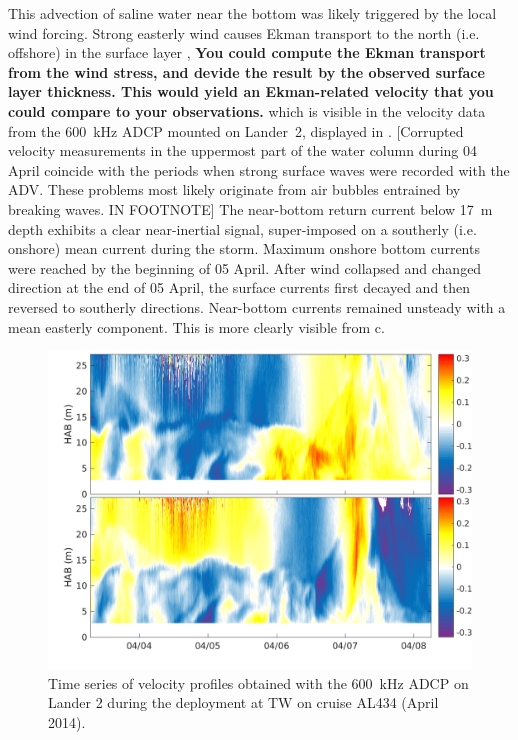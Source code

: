  This advection of saline water near the bottom was likely triggered by the 
local wind 
forcing. Strong easterly wind causes Ekman transport to the north (i.e. 
offshore) in the surface layer \citep[][]{lass2001}, \textbf{You could compute 
the Ekman transport from the wind stress, and devide the result by the observed 
surface layer thickness. This would yield an Ekman-related velocity that you 
could compare to your observations.} which is visible in the 
velocity data from the 600~kHz ADCP mounted on Lander~2, displayed in 
. [Corrupted velocity measurements in the uppermost part of the 
water column during 04 April coincide with the periods when strong surface 
waves were recorded with the ADV. These problems most likely originate from 
air bubbles entrained by breaking waves. IN FOOTNOTE] The near-bottom return 
current below 
17~m depth exhibits a clear near-inertial signal, super-imposed on a southerly 
(i.e. onshore) mean current during the storm. Maximum onshore bottom currents 
were reached by the beginning of 05 April. After wind collapsed and changed 
direction at the end of 05 April, the surface currents 
first decayed and then reversed to southerly directions. Near-bottom 
currents remained unsteady with a mean easterly component. This is more clearly 
visible from c.

 \begin{figure}[ht]
\includegraphics[width=40pc]{bilder/adcp600.png}
 \caption{Time series of velocity profiles obtained with the 600~kHz ADCP on 
Lander 2 during the deployment at TW on cruise AL434 (April 2014).}
 \label{adcp600}
 \end{figure}

